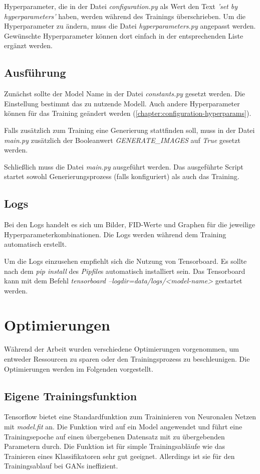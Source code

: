 Hyperparameter, die in der Datei \textit{configuration.py} als Wert den Text \textit{'set by hyperparameters'} haben, werden während des Trainings überschrieben.
Um die Hyperparameter zu ändern, muss die Datei \textit{hyperparameters.py} angepasst werden.
Gewünschte Hyperparameter können dort einfach in der entsprechenden Liste ergänzt werden.

\subsection{Ausführung}
Zunächst sollte der Model Name in der Datei \textit{constants.py} gesetzt werden.
Die Einstellung bestimmt das zu nutzende Modell.
Auch andere Hyperparameter können für das Training geändert werden (\cref{chapter:configuration-hyperparams}).
\newline

Falls zusätzlich zum Training eine Generierung stattfinden soll, muss in der Datei \textit{main.py} zusätzlich der Booleanwert \textit{GENERATE\_IMAGES} auf \textit{True} gesetzt werden.
\newline

Schließlich muss die Datei \textit{main.py} ausgeführt werden.
Das ausgeführte Script startet sowohl Generierungsprozess (falls konfiguriert) als auch das Training.

\subsection{Logs}
Bei den Logs handelt es sich um Bilder, FID-Werte und Graphen für die jeweilige Hyperparameterkombinationen.
Die Logs werden während dem Training automatisch erstellt.
\newline

Um die Logs einzusehen empfiehlt sich die Nutzung von Tensorboard.
Es sollte nach dem \textit{pip install} des \textit{Pipfile}s automatisch installiert sein.
Das Tensorboard kann mit dem Befehl \textit{tensorboard --logdir=data/logs/<model-name>} gestartet werden.

\section{Optimierungen}
Während der Arbeit wurden verschiedene Optimierungen vorgenommen, um entweder Ressourcen zu sparen oder den Trainingsprozess zu beschleunigen.
Die Optimierungen werden im Folgenden vorgestellt.

\subsection{Eigene Trainingsfunktion}
Tensorflow bietet eine Standardfunktion zum Traininieren von Neuronalen Netzen mit \textit{model.fit} an.
Die Funktion wird auf ein Model angewendet und führt eine Trainingsepoche auf einen übergebenen Datensatz mit zu übergebenden Parametern durch.
Die Funktion ist für simple Trainingsabläufe wie das Trainieren eines Klassifikatoren sehr gut geeignet.
Allerdings ist sie für den Trainingsablauf bei GANs ineffizient.
\newline

